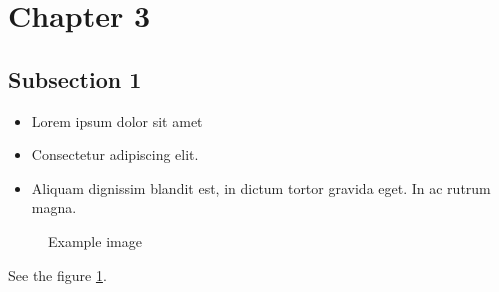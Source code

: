 \section{Chapter 3}

\lipsum[4]


\subsection{Subsection 1}

\begin{itemize}
\item Lorem ipsum dolor sit amet\cite{example}
\item Consectetur adipiscing elit. 
\item Aliquam dignissim blandit est, in dictum tortor gravida eget. In ac rutrum magna.
\end{itemize}

\begin{figure}[h]
\centering
  \caption{Example image}
  \label{fig:image1}
\end{figure}

See the figure \ref{fig:image1}.
